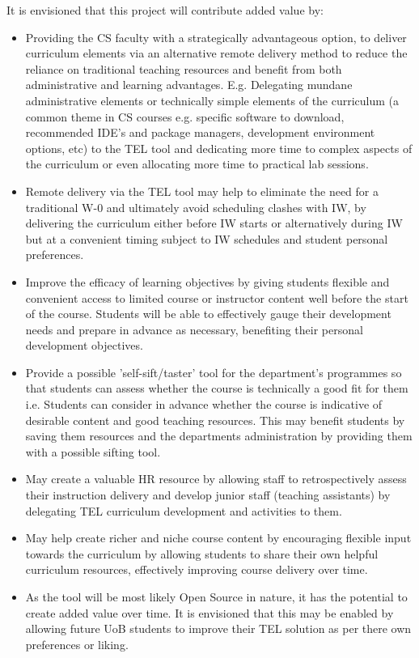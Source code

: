 It is envisioned that this project will contribute added value by:
\begin{itemize}
    \item Providing the CS faculty with a strategically advantageous option, to deliver curriculum elements via an alternative remote delivery method to reduce the reliance on traditional teaching resources and benefit from both administrative and learning advantages. E.g. Delegating mundane administrative elements or technically simple elements of the curriculum (a common theme in CS courses e.g. specific software to download, recommended IDE's and package managers, development environment options, etc) to the TEL tool and dedicating more time to complex aspects of the curriculum or even allocating more time to practical lab sessions.
    
    \item Remote delivery via the TEL tool may help to eliminate the need for a traditional W-0 and ultimately avoid scheduling clashes with IW, by delivering the curriculum either before IW starts or alternatively during IW but at a  convenient timing subject to IW schedules and student personal preferences.
    
    \item Improve the efficacy of learning objectives by giving students flexible and convenient access to limited course or instructor content well before the start of the course. Students will be able to effectively gauge their development needs and prepare in advance as necessary, benefiting their personal development objectives.
    
    \item Provide a possible 'self-sift/taster' tool for the department's programmes so that students can assess whether the course is technically a good fit for them i.e. Students can consider in advance whether the course is indicative of desirable content and good teaching resources. This may benefit students by saving them resources and the departments administration by providing them with a possible sifting tool.
    
    \item May create a valuable HR resource by allowing staff to retrospectively assess their instruction delivery and develop junior staff (teaching assistants) by delegating TEL curriculum development and activities to them.
    
    \item May help create richer and niche course content by encouraging flexible input towards the curriculum by allowing students to share their own helpful curriculum resources, effectively improving course delivery over time.
    
    \item As the tool will be most likely Open Source in nature, it has the potential to create added value over time. It is envisioned that this may be enabled by allowing future UoB students to improve their TEL solution as per there own preferences or liking.
    
\end{itemize}








